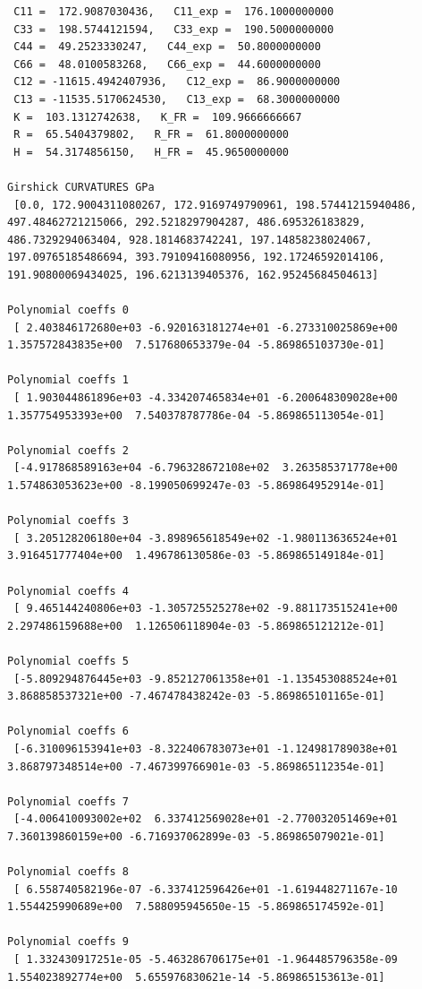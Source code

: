 \documentclass[11pt]{article}
\begin{document}
\begin{verbatim}
 C11 =  172.9087030436,   C11_exp =  176.1000000000
 C33 =  198.5744121594,   C33_exp =  190.5000000000
 C44 =  49.2523330247,   C44_exp =  50.8000000000
 C66 =  48.0100583268,   C66_exp =  44.6000000000
 C12 = -11615.4942407936,   C12_exp =  86.9000000000
 C13 = -11535.5170624530,   C13_exp =  68.3000000000
 K =  103.1312742638,   K_FR =  109.9666666667
 R =  65.5404379802,   R_FR =  61.8000000000
 H =  54.3174856150,   H_FR =  45.9650000000 

Girshick CURVATURES GPa 
 [0.0, 172.9004311080267, 172.9169749790961, 198.57441215940486, 497.48462721215066, 292.5218297904287, 486.695326183829, 486.7329294063404, 928.1814683742241, 197.14858238024067, 197.09765185486694, 393.79109416080956, 192.17246592014106, 191.90800069434025, 196.6213139405376, 162.95245684504613] 

Polynomial coeffs 0 
 [ 2.403846172680e+03 -6.920163181274e+01 -6.273310025869e+00  1.357572843835e+00  7.517680653379e-04 -5.869865103730e-01]

Polynomial coeffs 1 
 [ 1.903044861896e+03 -4.334207465834e+01 -6.200648309028e+00  1.357754953393e+00  7.540378787786e-04 -5.869865113054e-01]

Polynomial coeffs 2 
 [-4.917868589163e+04 -6.796328672108e+02  3.263585371778e+00  1.574863053623e+00 -8.199050699247e-03 -5.869864952914e-01]

Polynomial coeffs 3 
 [ 3.205128206180e+04 -3.898965618549e+02 -1.980113636524e+01  3.916451777404e+00  1.496786130586e-03 -5.869865149184e-01]

Polynomial coeffs 4 
 [ 9.465144240806e+03 -1.305725525278e+02 -9.881173515241e+00  2.297486159688e+00  1.126506118904e-03 -5.869865121212e-01]

Polynomial coeffs 5 
 [-5.809294876445e+03 -9.852127061358e+01 -1.135453088524e+01  3.868858537321e+00 -7.467478438242e-03 -5.869865101165e-01]

Polynomial coeffs 6 
 [-6.310096153941e+03 -8.322406783073e+01 -1.124981789038e+01  3.868797348514e+00 -7.467399766901e-03 -5.869865112354e-01]

Polynomial coeffs 7 
 [-4.006410093002e+02  6.337412569028e+01 -2.770032051469e+01  7.360139860159e+00 -6.716937062899e-03 -5.869865079021e-01]

Polynomial coeffs 8 
 [ 6.558740582196e-07 -6.337412596426e+01 -1.619448271167e-10  1.554425990689e+00  7.588095945650e-15 -5.869865174592e-01]

Polynomial coeffs 9 
 [ 1.332430917251e-05 -5.463286706175e+01 -1.964485796358e-09  1.554023892774e+00  5.655976830621e-14 -5.869865153613e-01]


\end{verbatim}
\end{document}
